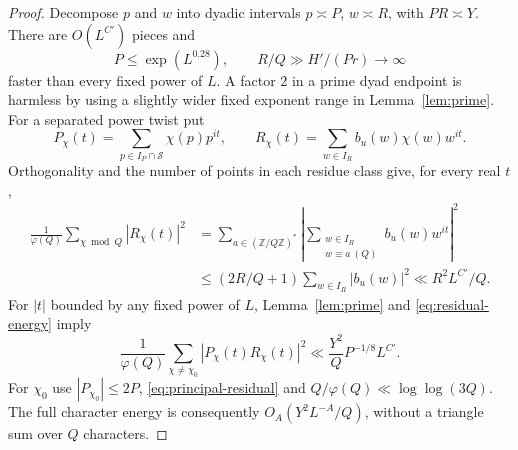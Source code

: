 \documentclass[11pt]{article}
\theoremstyle{definition}
\newcommand{\Z}{\mathbb Z}
\newcommand{\Sset}{\mathcal S}
\theoremstyle{remark}
\begin{document}
\begin{proof}
Decompose $p$ and $w$ into dyadic intervals $p\asymp P$,
$w\asymp R$, with $PR\asymp Y$. There are $O(L^{C'})$ pieces and
\begin{equation}\label{eq:residual-length}
P\le\exp(L^{0.28}),\qquad
R/Q\gg H'/(Pr)\longrightarrow\infty
\end{equation}
faster than every fixed power of $L$. A factor $2$ in a prime dyad
endpoint is harmless by using a slightly wider fixed exponent range
in Lemma~\ref{lem:prime}.
For a separated power twist put
\begin{equation}\label{eq:character-polynomials}
P_\chi(t)=\sum_{p\in I_P\cap\Sset}\chi(p)p^{it},
\qquad R_\chi(t)=\sum_{w\in I_R}b_u(w)\chi(w)w^{it}.
\end{equation}
Orthogonality and the number of points in each residue class give,
for every real $t$,
\begin{equation}\label{eq:residual-energy}
\begin{split}
\frac1{\varphi(Q)}\sum_{\chi\bmod Q}|R_\chi(t)|^2
&=\sum_{a\in(\Z/Q\Z)^*}
  \left|\sum_{\substack{w\in I_R\\w\equiv a\ (Q)}}
                 b_u(w)w^{it}\right|^2\\
&\le(2R/Q+1)\sum_{w\in I_R}|b_u(w)|^2
 \ll R^2L^{C'}/Q.
\end{split}
\end{equation}
For $|t|$ bounded by any fixed power of $L$, Lemma~\ref{lem:prime}
and \eqref{eq:residual-energy} imply
\begin{equation}\label{eq:nonprincipal-energy}
\frac1{\varphi(Q)}\sum_{\chi\ne\chi_0}|P_\chi(t)R_\chi(t)|^2
\ll \frac{Y^2}{Q}P^{-1/8}L^{C'}.
\end{equation}
For $\chi_0$ use $|P_{\chi_0}|\le2P$,
\eqref{eq:principal-residual} and
$Q/\varphi(Q)\ll\log\log(3Q)$.
The full character energy is consequently
$O_A(Y^2L^{-A}/Q)$, without a triangle sum over $Q$ characters.


\end{proof}
\end{document}
